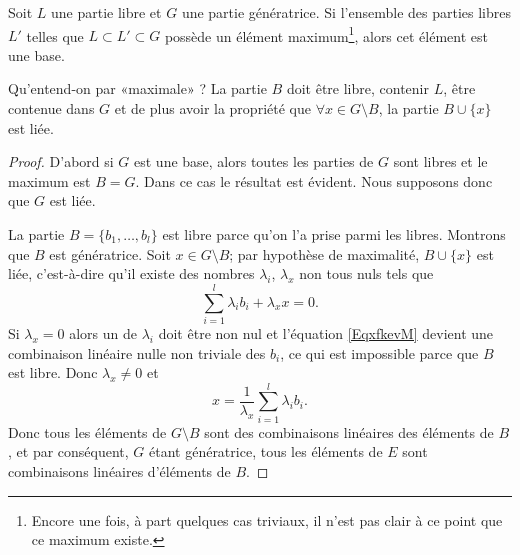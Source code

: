 \begin{lemma}   \label{LemkUfzHl}
    Soit \( L\) une partie libre et \( G\) une partie génératrice. Si l'ensemble des parties libres \( L'\) telles que \( L\subset L'\subset G\) possède un élément maximum\footnote{Encore une fois, à part quelques cas triviaux, il n'est pas clair à ce point que ce maximum existe.}, alors cet élément est une base.
\end{lemma}
Qu'entend-on par «maximale» ? La partie \( B\) doit être libre, contenir \( L\), être contenue dans \( G\) et de plus avoir la propriété que \( \forall x\in G\setminus B\), la partie \( B\cup\{ x \}\) est liée.

\begin{proof}
    D'abord si \( G\) est une base, alors toutes les parties de \( G\) sont libres et le maximum est \( B=G\). Dans ce cas le résultat est évident. Nous supposons donc que \( G\) est liée.

    La partie \( B=\{ b_1,\ldots, b_l \}\) est libre parce qu'on l'a prise parmi les libres. Montrons que \( B\) est génératrice. Soit \( x\in G\setminus B\); par hypothèse de maximalité, \( B\cup\{ x \}\) est liée, c'est-à-dire qu'il existe des nombres \( \lambda_i\), \( \lambda_x\) non tous nuls tels que
    \begin{equation}    \label{EqxfkevM}
        \sum_{i=1}^l\lambda_ib_i+\lambda_xx=0.
    \end{equation}
    Si \( \lambda_x=0\) alors un de \( \lambda_i\) doit être non nul et l'équation \eqref{EqxfkevM} devient une combinaison linéaire nulle non triviale des \( b_i\), ce qui est impossible parce que \( B\) est libre. Donc \( \lambda_x\neq 0\) et
    \begin{equation}
        x=\frac{1}{ \lambda_x }\sum_{i=1}^l\lambda_ib_i.
    \end{equation}
    Donc tous les éléments de \( G\setminus B\) sont des combinaisons linéaires des éléments de \( B\), et par conséquent, \( G\) étant génératrice, tous les éléments de \( E\) sont combinaisons linéaires d'éléments de \( B\).
\end{proof}


